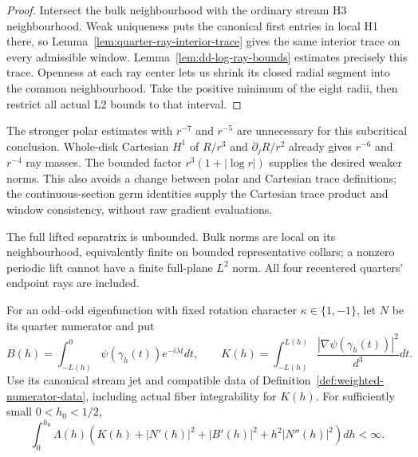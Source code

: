 \begin{proof}
\leanok
Intersect the bulk neighbourhood with the ordinary stream H3 neighbourhood.
Weak uniqueness puts the canonical first entries in local H1 there, so
Lemma~\ref{lem:quarter-ray-interior-trace} gives the same interior trace
on every admissible window.
Lemma~\ref{lem:dd-log-ray-bounds} estimates precisely this trace.
Openness at each ray center lets us shrink its closed radial segment into
the common neighbourhood. Take the positive minimum of the eight radii,
then restrict all actual L2 bounds to that interval.
\end{proof}

\begin{remark}
The stronger polar estimates with $r^{-7}$ and $r^{-5}$ are unnecessary
for this subcritical conclusion. Whole-disk Cartesian $H^1$ of $R/r^3$
and $\partial_jR/r^2$ already gives $r^{-6}$ and $r^{-4}$ ray masses.
The bounded factor $r^3(1+|\log r|)$ supplies the desired weaker norms.
This also avoids a change between polar and Cartesian trace definitions;
the continuous-section germ identities supply the Cartesian trace product
and window consistency, without raw gradient evaluations.
\end{remark}

\begin{remark}
The full lifted separatrix is unbounded. Bulk norms are local on its
neighbourhood, equivalently finite on bounded representative collars;
a nonzero periodic lift cannot have a finite full-plane $L^2$ norm.
All four recentered quarters' endpoint rays are included.
\end{remark}

\begin{lemma}
\label{lem:dd-log-numerators}
\leanok
For an odd--odd eigenfunction with fixed rotation character
$\kappa\in\{1,-1\}$, let $N$ be its quarter numerator and put
\[
 B(h)=\int_{-L(h)}^0\psi(\gamma_h(t))e^{-i\lambda t}dt,\qquad
 K(h)=\int_{-L(h)}^{L(h)}\frac{|\nabla\psi(\gamma_h(t))|^2}{d^3}dt.
\]
Use its canonical stream jet and compatible data of
Definition~\ref{def:weighted-numerator-data}, including actual fiber
integrability for $K(h)$. For sufficiently small $0<h_0<1/2$,
\[
 \int_0^{h_0}\Lambda(h)\left(K(h)+|N'(h)|^2+|B'(h)|^2
                                  +h^2|N''(h)|^2\right)dh<\infty.
\]
\end{lemma}

